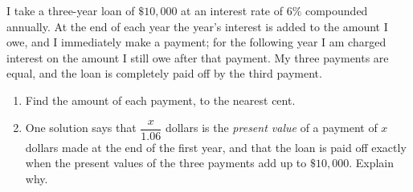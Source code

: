 I take a three-year loan of $\$10{,}000$ at an interest rate of $6\%$ compounded annually. At the end of each year the year's interest is added to the amount I owe, and I immediately make a payment; for the following year I am charged interest on the amount I still owe after that payment. My three payments are equal, and the loan is completely paid off by the third payment.
\begin{enumerate}
\item[(a)] Find the amount of each payment, to the nearest cent.
\item[(b)] One solution says that $\dfrac{x}{1.06}$ dollars is the \emph{present value} of a payment of $x$ dollars made at the end of the first year, and that the loan is paid off exactly when the present values of the three payments add up to $\$10{,}000$. Explain why.
\end{enumerate}
